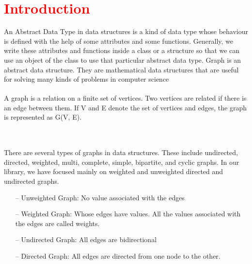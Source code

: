 \documentclass[11pt,a4paper]{article}
\begin{document}

\section*{\textcolor{red}{Introduction}}
\label{sec:introduction}
An Abstract Data Type in data structures is a kind of data type whose behaviour is defined with the help of some attributes and some functions. Generally, we write these attributes and functions inside a class or a structure so that we can use an object of the class to use that particular abstract data type. Graph is an abstract data structure. They are mathematical data structures that are useful for solving many kinds of problems in computer science
\\
\\
A graph is a relation on a finite set of vertices. Two vertices are related if there is an edge between them. If V and E denote the set of vertices and edges, the graph is represented as G(V, E).

\\
\\
There are several types of graphs in data structures. These include undirected, directed, weighted, multi, complete, simple, bipartite, and cyclic graphs. In our library, we have focused mainly on weighted and unweighted directed and undirected graphs.
\\
\begin{itemize}  
\item[--] Unweighted Graph: No value associated with the edges
\item[--] Weighted Graph: Whose edges have values. All the values associated with the edges are called weights.
\item[--] Undirected Graph: All edges are bidirectional
\item[--] Directed Graph: All edges are directed from one node to the other.
\\
\end{itemize}  
\end{document}
